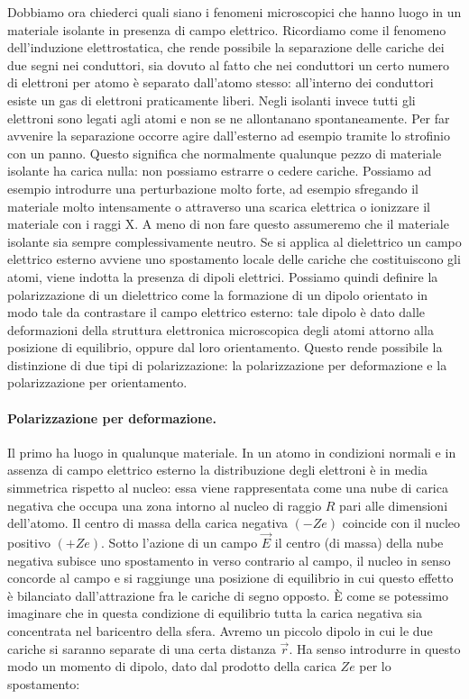 Dobbiamo ora chiederci quali siano i fenomeni microscopici che hanno luogo in un materiale isolante in presenza di campo elettrico. Ricordiamo come il fenomeno dell'induzione elettrostatica, che rende possibile la separazione delle cariche dei due segni nei conduttori, sia dovuto al fatto che nei conduttori un certo numero di elettroni per atomo è separato dall'atomo stesso: all'interno dei conduttori esiste un gas di elettroni praticamente liberi. Negli isolanti invece tutti gli elettroni sono legati agli atomi e non se ne allontanano spontaneamente. Per far avvenire la separazione occorre agire dall'esterno ad esempio tramite lo strofinio con un panno. Questo significa che normalmente qualunque pezzo di materiale isolante ha carica nulla: non possiamo estrarre o cedere cariche. Possiamo ad esempio introdurre una perturbazione molto forte, ad esempio sfregando il materiale molto intensamente o attraverso una scarica elettrica o ionizzare il materiale con i raggi X. A meno di non fare questo assumeremo che il materiale isolante sia sempre complessivamente neutro.
Se si applica al dielettrico un campo elettrico esterno avviene uno spostamento locale delle cariche che costituiscono gli atomi, viene indotta la presenza di dipoli elettrici. Possiamo quindi definire la polarizzazione di un dielettrico come la formazione di un dipolo orientato in modo tale da contrastare il campo elettrico esterno: tale dipolo è dato dalle deformazioni della struttura elettronica microscopica degli atomi attorno alla posizione di equilibrio, oppure dal loro orientamento. Questo rende possibile la distinzione di due tipi di polarizzazione: la polarizzazione per deformazione e la polarizzazione per orientamento.

\paragraph{Polarizzazione per deformazione.} Il primo ha luogo in qualunque materiale. In un atomo in condizioni normali e in assenza di campo elettrico esterno la distribuzione degli elettroni è in media simmetrica rispetto al nucleo: essa viene rappresentata come una nube di carica negativa che occupa una zona intorno al nucleo di raggio $R$ pari alle dimensioni dell'atomo. Il centro di massa della carica negativa $(-Ze)$ coincide con il nucleo positivo $(+Ze)$. Sotto l'azione di un campo $\vec{E}$ il centro (di massa) della nube negativa subisce uno spostamento in verso contrario al campo, il nucleo in senso concorde al campo e si raggiunge una posizione di equilibrio in cui questo effetto è bilanciato dall'attrazione fra le cariche di segno opposto. È come se potessimo imaginare che in questa condizione di equilibrio tutta la carica negativa sia concentrata nel baricentro della sfera. Avremo un piccolo dipolo in cui le due cariche si saranno separate di una certa distanza $\vec{r}$. Ha senso introdurre in questo modo un momento di dipolo, dato dal prodotto della carica $Ze$ per lo spostamento:

